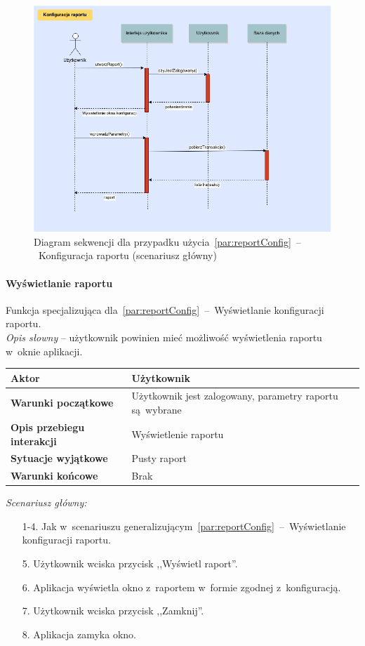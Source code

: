 \begin{figure}[H]
  \includegraphics[width=\textwidth]{images/raport_konfig.png}
  \caption{Diagram sekwencji dla przypadku użycia~\ref{par:reportConfig}~--~Konfiguracja raportu (scenariusz główny)}
\end{figure}

\paragraph{Wyświetlanie raportu\newline}
\label{par:reportView}
\indent Funkcja specjalizująca dla~\ref{par:reportConfig}~--~Wyświetlanie konfiguracji raportu.\\

\textit{Opis słowny} -- użytkownik powinien mieć możliwość wyświetlenia raportu w~oknie aplikacji.

\begin{longtable}{|p{5cm}|p{7cm}|}
  \hline \textbf{Aktor} & Użytkownik \\
  \hline \textbf{Warunki początkowe} & Użytkownik jest zalogowany, parametry raportu są~wybrane \\
  \hline \textbf{Opis przebiegu interakcji} & Wyświetlenie raportu \\
  \hline \textbf{Sytuacje wyjątkowe} & Pusty raport \\
  \hline \textbf{Warunki końcowe} & Brak \\
  \hline
\end{longtable}

\noindent \textit{Scenariusz główny:}
\begin{enumerate}
  \item[1-4.] Jak w~scenariuszu generalizującym~\ref{par:reportConfig}~--~Wyświetlanie konfiguracji raportu.
  \item[5.] Użytkownik wciska przycisk ,,Wyświetl raport''.
  \item[6.] Aplikacja wyświetla okno z~raportem w~formie zgodnej z~konfiguracją.
  \item[7.] Użytkownik wciska przycisk ,,Zamknij''.
  \item[8.] Aplikacja zamyka okno.
\end{enumerate}

